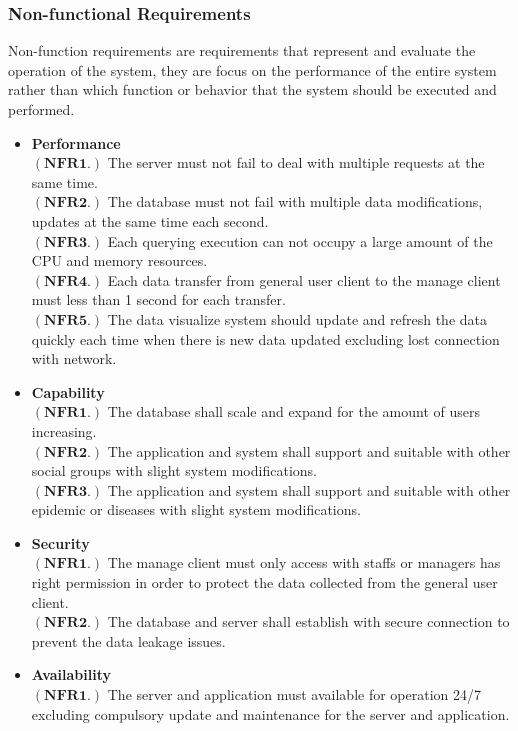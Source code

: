 \documentclass[12pt]{article}
\begin{document}
\subsubsection{Non-functional Requirements}
Non-function requirements are requirements that represent and evaluate the operation of the system, they are focus on the performance of the entire system rather than which function or behavior that the system should be executed and performed.
\begin{itemize}
\item\textbf{Performance}
\\$\mathbf{(NFR1.)}$ The server must not fail to deal with multiple requests at the same time.
\\$\mathbf{(NFR2.)}$ The database must not fail with multiple data modifications, updates at the same time each second.
\\$\mathbf{(NFR3.)}$ Each querying execution can not occupy a large amount of the CPU and memory resources.
\\$\mathbf{(NFR4.)}$ Each data transfer from general user client to the manage client must less than 1 second for each transfer.
\\$\mathbf{(NFR5.)}$ The data visualize system should update and refresh the data quickly each time when there is new data updated excluding lost connection with network.
\item\textbf{Capability}
\\$\mathbf{(NFR1.)}$ The database shall scale and expand for the amount of users increasing.
\\$\mathbf{(NFR2.)}$ The application and system shall support and suitable with other social groups with slight system modifications.
\\$\mathbf{(NFR3.)}$ The application and system shall support and suitable with other epidemic or diseases with slight system modifications.
\item\textbf{Security}
\\$\mathbf{(NFR1.)}$ The manage client must only access with staffs or managers has right permission in order to protect the data collected from the general user client.
\\$\mathbf{(NFR2.)}$ The database and server shall establish with secure connection to prevent the data leakage issues.
\item\textbf{Availability}
\\$\mathbf{(NFR1.)}$ The server and application must available for operation 24/7 excluding compulsory update and maintenance for the server and application.
\end{itemize}
\end{document}
